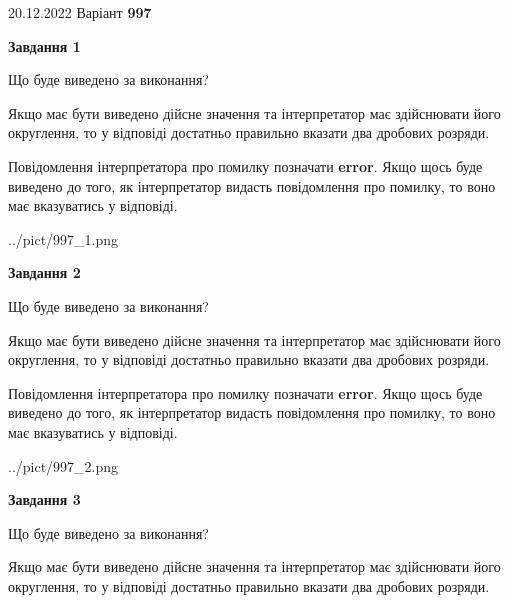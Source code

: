 \documentclass[12pt, ukrainian]{article}
\begin{document}
{20.12.2022 Варіант \No \textbf { 997 }\par}
{
\begin {Large}

{\begin {center}\textbf{Завдання 1}\end {center}}\par
Що буде виведено за виконання? \par

Якщо має бути виведено дійсне значення та інтерпретатор має здійснювати його округлення, 
то у відповіді достатньо правильно вказати два дробових розряди.

Повідомлення інтерпретатора про помилку позначати \textbf{error}.
Якщо щось буде виведено до того, як інтерпретатор видасть повідомлення про помилку, 
то воно має вказуватись у відповіді. \par

\begin{center}
	{../pict/997_1.png}
\end{center}
\newpage

{\begin {center}\textbf{Завдання 2}\end {center}}\par
Що буде виведено за виконання? \par

Якщо має бути виведено дійсне значення та інтерпретатор має здійснювати його округлення, 
то у відповіді достатньо правильно вказати два дробових розряди.

Повідомлення інтерпретатора про помилку позначати \textbf{error}.
Якщо щось буде виведено до того, як інтерпретатор видасть повідомлення про помилку, 
то воно має вказуватись у відповіді. \par

\begin{center}
	{../pict/997_2.png}
\end{center}
\newpage

{\begin {center}\textbf{Завдання 3}\end {center}}\par
Що буде виведено за виконання? \par

Якщо має бути виведено дійсне значення та інтерпретатор має здійснювати його округлення, 
то у відповіді достатньо правильно вказати два дробових розряди.


\end{Large}}
\end{document}
